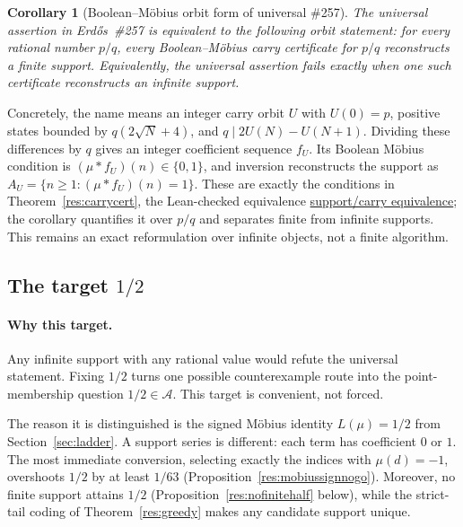 \documentclass[11pt]{article}
\newcommand{\commit}{312b96c0d149ed466725c62d4ef24cfc91bca34e}
\newcommand{\repobase}{https://github.com/wcook04/plectis-lean-erdos249-257/blob/\commit}
\newcommand{\PK}{Erdos249257}
\newcommand{\lword}[4]{\href{\repobase/\PK/#1\#L#2}{#4}}
\newtheorem{corollary}[theorem]{Corollary}
\theoremstyle{definition}
\theoremstyle{remark}
\begin{document}
\begin{corollary}[Boolean--M\"obius orbit form of universal \#257]
\label{res:universal-boolean-obstruction}
The universal assertion in Erd\H{o}s~\#257 is equivalent to the following
orbit statement: for every rational number \(p/q\), every
Boolean--M\"obius carry certificate for \(p/q\) reconstructs a finite
support.  Equivalently, the universal assertion fails exactly when one such
certificate reconstructs an infinite support.
\end{corollary}
\noindent Concretely, the name means an integer carry orbit \(U\) with
\(U(0)=p\), positive states bounded by \(q(2\sqrt N+4)\), and
\(q\mid 2U(N)-U(N+1)\).  Dividing these differences by \(q\) gives an
integer coefficient sequence \(f_U\).  Its Boolean M\"obius condition is
\((\mu*f_U)(n)\in\{0,1\}\), and inversion reconstructs the support as
\(A_U=\{n\geq1:(\mu*f_U)(n)=1\}\).  These are exactly the conditions in
Theorem~\ref{res:carrycert}, the Lean-checked equivalence
\lword{BooleanMobiusCarry.lean}{948}{exists_normalized_support_fraction_iff_exists_booleanMobiusCarry}{support/carry equivalence};
the corollary quantifies it over \(p/q\) and separates finite from infinite
supports.  This remains an exact reformulation over infinite objects, not a
finite algorithm.

\subsection{The target \(1/2\)}

\paragraph{Why this target.}
Any infinite support with any rational value would refute the universal
statement.  Fixing \(1/2\) turns one possible counterexample route into the
point-membership question \(1/2\in\mathcal A\).  This target is convenient,
not forced.

The reason it is distinguished is the signed M\"obius identity
\(L(\mu)=1/2\) from Section~\ref{sec:ladder}.  A support series is different:
each term has coefficient \(0\) or \(1\).  The most immediate conversion,
selecting exactly the indices with \(\mu(d)=-1\), overshoots \(1/2\) by at
least \(1/63\) (Proposition~\ref{res:mobiussignnogo}).  Moreover, no finite
support attains \(1/2\) (Proposition~\ref{res:nofinitehalf} below), while the
strict-tail coding of Theorem~\ref{res:greedy} makes any candidate support
unique.
\end{document}
